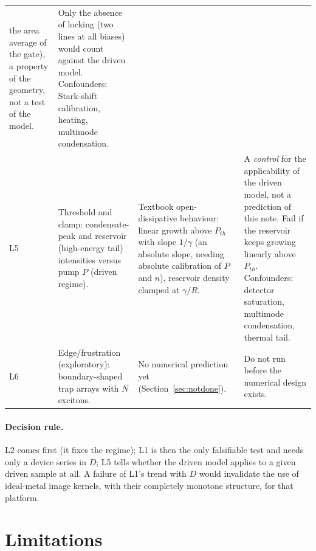 \documentclass[11pt,a4paper]{article}
\begin{document}
\begin{longtable}{@{}p{}p{}p{}p{}@{}}
 the area average of the gate), a property of the geometry, not a test of the model.
 & Only the absence of locking (two lines at all biases) would count against the driven model. Confounders: Stark-shift calibration,
 heating, multimode condensation. \\
L5 & Threshold and clamp: condensate-peak and reservoir (high-energy tail) intensities versus pump $P$ (driven regime).
 & Textbook open-dissipative behaviour: linear growth above $P_{th}$ with slope $1/\gamma$ (an absolute slope, needing absolute calibration
 of $P$ and $n$), reservoir density clamped at $\gamma/R$.
 & A \emph{control} for the applicability of the driven model, not a prediction of this note. Fail if the reservoir keeps growing
 linearly above $P_{th}$. Confounders: detector saturation, multimode condensation, thermal tail. \\
L6 & Edge/frustration (exploratory): boundary-shaped trap arrays with $N$ excitons.
 & No numerical prediction yet (Section~\ref{sec:notdone}).
 & Do not run before the numerical design exists. \\
\bottomrule
\end{longtable}

\paragraph{Decision rule.} L2 comes first (it fixes the regime); L1 is then the only falsifiable test and needs only a device series
in $D$; L5 tells whether the driven model applies to a given driven sample at all. A failure of L1's trend with $D$ would
invalidate the use of ideal-metal image kernels, with their completely monotone structure, for that platform.

\section{Limitations}
\end{document}
